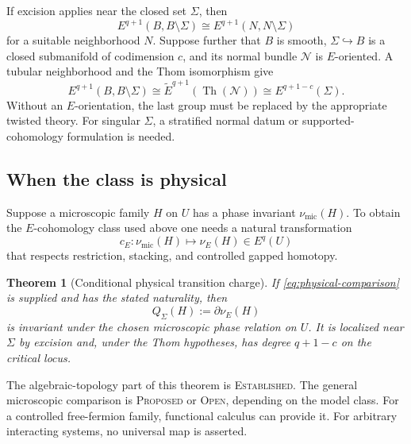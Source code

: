 \documentclass[12pt]{article}
\newtheorem{theorem}{Theorem}[section]
\theoremstyle{definition}
\theoremstyle{remark}
\newcommand{\Th}{\operatorname{Th}}
\newcommand{\EST}{\textnormal{\textsc{Established}}}
\newcommand{\PROP}{\textnormal{\textsc{Proposed}}}
\newcommand{\OPEN}{\textnormal{\textsc{Open}}}
\begin{document}
If excision applies near the closed set $\Sigma$, then
\begin{equation}
E^{q+1}(B,B\setminus\Sigma)
\cong
E^{q+1}(N,N\setminus\Sigma)
\label{eq:excision-local}
\end{equation}
for a suitable neighborhood $N$.  Suppose further that $B$ is smooth,
$\Sigma\hookrightarrow B$ is a closed submanifold of codimension $c$, and
its normal bundle $\mathcal N$ is $E$-oriented.  A tubular neighborhood and
the Thom isomorphism give
\begin{equation}
E^{q+1}(B,B\setminus\Sigma)
\cong
\widetilde E^{q+1}(\Th(\mathcal N))
\cong
E^{q+1-c}(\Sigma).
\label{eq:thom-charge}
\end{equation}
Without an $E$-orientation, the last group must be replaced by the
appropriate twisted theory.  For singular $\Sigma$, a stratified normal
datum or supported-cohomology formulation is needed.

\subsection{When the class is physical}

Suppose a microscopic family $H$ on $U$ has a phase invariant
$\nu_{\mathrm{mic}}(H)$.  To obtain the $E$-cohomology class used above one
needs a natural transformation
\begin{equation}
c_E:\nu_{\mathrm{mic}}(H)\longmapsto\nu_E(H)\in E^q(U)
\label{eq:physical-comparison}
\end{equation}
that respects restriction, stacking, and controlled gapped homotopy.

\begin{theorem}[Conditional physical transition charge]
\label{thm:conditional-charge}
If \cref{eq:physical-comparison} is supplied and has the stated naturality,
then
\begin{equation}
Q_\Sigma(H):=\partial\nu_E(H)
\end{equation}
is invariant under the chosen microscopic phase relation on $U$.  It is
localized near $\Sigma$ by excision and, under the Thom hypotheses, has
degree $q+1-c$ on the critical locus.
\end{theorem}

The algebraic-topology part of this theorem is \EST{}.  The general
microscopic comparison is \PROP{} or \OPEN{}, depending on the model class.
For a controlled free-fermion family, functional calculus can provide it.
For arbitrary interacting systems, no universal map is asserted.
\end{document}

